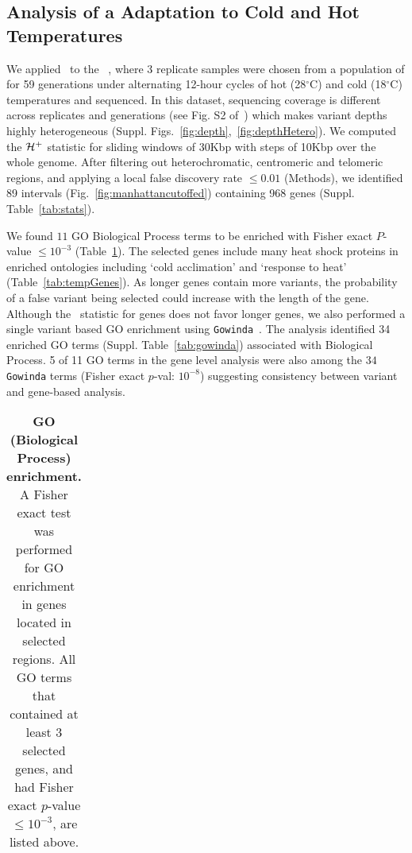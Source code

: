 \subsection{Analysis of a \dmel Adaptation to Cold and Hot 
Temperatures}\label{sec:dmel}
We applied \comale\ to the \datadm~\cite{orozco2012adaptation}, where
3 replicate samples were chosen from a population of \dmel for 59
generations under alternating 12-hour cycles of hot (28$^{\circ}$C)
and cold (18$^{\circ}$C) temperatures and sequenced.  In this dataset,
sequencing coverage is different across replicates and generations
(see Fig. S2 of~\cite{Terhorst2015Multi}) which makes variant depths
highly heterogeneous (Suppl.
Figs.~\ref{fig:depth},~\ref{fig:depthHetero}). We computed the
${\cal H}^{+}$ statistic for sliding windows of 30Kbp with steps of 10Kbp
over the whole genome. After filtering out heterochromatic,
centromeric and telomeric
regions\cite{fiston2010drosophila,comeron2012many}, and applying a
local false discovery rate $\le 0.01$ (Methods), we identified 89
intervals (Fig.~\ref{fig:manhattancutoffed}) containing 968 genes
(Suppl. Table~\ref{tab:stats}).

We found $11$ GO Biological Process terms to be enriched with Fisher
exact $P$-value $\le 10^{-3}$ (Table~\ref{tab:Fisher2}). The selected
genes include many heat shock proteins in enriched ontologies
including `cold acclimation' and `response to heat'
(Table~\ref{tab:tempGenes}). As longer genes contain more variants,
the probability of a false variant being selected could increase with
the length of the gene. Although the \comale\ statistic for genes does
not favor longer genes, we also performed a single variant based GO
enrichment using \texttt{Gowinda}~\cite{kofler2012gowinda}. The
analysis identified 34 enriched GO terms
(Suppl. Table~\ref{tab:gowinda}) associated with Biological Process. 5
of 11 GO terms in the gene level analysis were also among the $34$
\texttt{Gowinda} terms (Fisher exact $p$-val: $10^{-8}$) suggesting
consistency between variant and gene-based analysis.

\begin{table}[H]
	\begin{tabular}{c}
		
	\end{tabular}
	\caption{{\bf GO (Biological Process) enrichment.}\\ A Fisher exact test 
	was 
	performed for GO enrichment in genes located in selected regions. All GO 
	terms that contained at least $3$ selected genes, and had Fisher exact 
	$p$-value $\le 10^{-3}$, are listed above.}\label{tab:Fisher2}
\end{table}